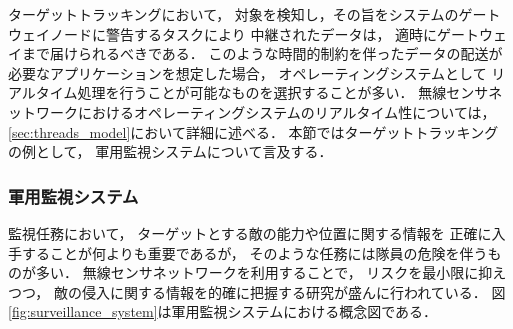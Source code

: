 ターゲットトラッキングにおいて，
対象を検知し，その旨をシステムのゲートウェイノードに警告するタスクにより
中継されたデータは，
適時にゲートウェイまで届けられるべきである．
このような時間的制約を伴ったデータの配送が必要なアプリケーションを想定した場合，
オペレーティングシステムとして
リアルタイム処理を行うことが可能なものを選択することが多い．
無線センサネットワークにおけるオペレーティングシステムのリアルタイム性については，
\ref{sec:threads_model}において詳細に述べる．
本節ではターゲットトラッキングの例として，
軍用監視システムについて言及する．




\subsubsection{軍用監視システム}

\vspace{0.5em}監視任務において，
ターゲットとする敵の能力や位置に関する情報を
正確に入手することが何よりも重要であるが，
そのような任務には隊員の危険を伴うものが多い．
無線センサネットワークを利用することで，
リスクを最小限に抑えつつ，
敵の侵入に関する情報を的確に把握する研究が盛んに行われている．
図\ref{fig:surveillance_system}は軍用監視システムにおける概念図である．

